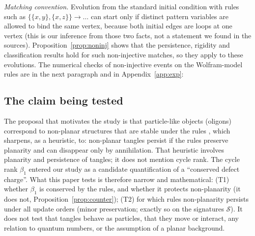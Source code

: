 \documentclass[10pt]{article}
\theoremstyle{definition}
\theoremstyle{plain}
\theoremstyle{remark}
\newcommand{\Betti}{\beta_1}
\begin{document}
\emph{Matching convention.} Evolution from the standard initial condition with rules such as $\{\{x,y\},\{x,z\}\}\to\dots$ can start only if distinct pattern variables are allowed to bind the same vertex, because both initial edges are loops at one vertex (this is our inference from those two facts, not a statement we found in the sources). Proposition~\ref{prop:noninj} shows that the persistence, rigidity and classification results hold for such non-injective matches, so they apply to these evolutions. The numerical checks of non-injective events on the Wolfram-model rules are in the next paragraph and in Appendix~\ref{app:exp}: 

\subsection{The claim being tested}
The proposal that motivates the study is that particle-like objects (oligons) correspond to non-planar structures that are stable under the rules \citep{wolfram2020project,wolframtechintro}, which \citet[\S2.4]{gorard2020relativistic} sharpens, as a heuristic, to: non-planar tangles persist if the rules preserve planarity and can disappear only by annihilation. That heuristic involves planarity and persistence of tangles; it does not mention cycle rank. The cycle rank $\Betti$ entered our study as a candidate quantification of a ``conserved defect charge''. What this paper tests is therefore narrow and mathematical: (T1) whether $\Betti$ is conserved by the rules, and whether it protects non-planarity (it does not, Proposition~\ref{prop:counter}); (T2) for which rules non-planarity persists under all update orders (minor preservation; exactly so on the signatures $\mathcal S$). It does not test that tangles behave as particles, that they move or interact, any relation to quantum numbers, or the assumption of a planar background.
\end{document}
